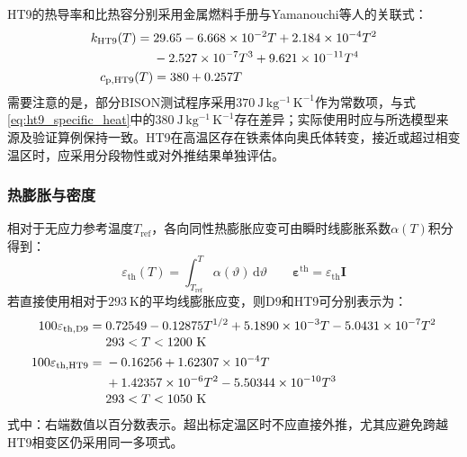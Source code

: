 HT9的热导率和比热容分别采用金属燃料手册与Yamanouchi等人的关联式\cite{hofmanMetallicFuelsHandbook2019,Yamanouchi_1992}：
\begin{subequations}\label{eq:ht9_thermal_properties}
	\begin{align}
		k_{\mathrm{HT9}}(T)
		={}&29.65-6.668\times10^{-2}T
		+2.184\times10^{-4}T^2
		\notag\\
		&-2.527\times10^{-7}T^3
		+9.621\times10^{-11}T^4
		\label{eq:ht9_thermal_conductivity}\\
		c_{\mathrm p,\mathrm{HT9}}(T)
		&=380+0.257T
		\label{eq:ht9_specific_heat}
	\end{align}
\end{subequations}
需要注意的是，部分BISON测试程序采用$370\ \mathrm{J\,kg^{-1}\,K^{-1}}$作为常数项，与式\eqref{eq:ht9_specific_heat}中的$380\ \mathrm{J\,kg^{-1}\,K^{-1}}$存在差异；实际使用时应与所选模型来源及验证算例保持一致。HT9在高温区存在铁素体向奥氏体转变，接近或超过相变温区时，应采用分段物性或对外推结果单独评估。

\subsubsection{热膨胀与密度}

相对于无应力参考温度$T_{\mathrm{ref}}$，各向同性热膨胀应变可由瞬时线膨胀系数$\alpha(T)$积分得到：
\begin{equation}
	\varepsilon_{\mathrm{th}}(T)
	=\int_{T_{\mathrm{ref}}}^{T}\alpha(\vartheta)\,\mathrm d\vartheta
	\qquad
	\boldsymbol{\varepsilon}^{\mathrm{th}}
	=\varepsilon_{\mathrm{th}}\boldsymbol I
	\label{eq:clad_thermal_strain_general}
\end{equation}
若直接使用相对于$293\ \mathrm{K}$的平均线膨胀应变，则D9和HT9可分别表示为\cite{Leibowitz_1988,hofmanMetallicFuelsHandbook2019}：
\begin{subequations}\label{eq:clad_d9_ht9_thermal_expansion}
	\begin{align}
		100\varepsilon_{\mathrm{th,D9}}
		={}&0.72549-0.12875T^{1/2}
		+5.1890\times10^{-3}T
		-5.0431\times10^{-7}T^2
		\nonumber\\[-0.2em]
		&293<T<1200\ \mathrm{K}
		\label{eq:d9_thermal_expansion}\\
		100\varepsilon_{\mathrm{th,HT9}}
		={}&-0.16256+1.62307\times10^{-4}T
		\notag\\
		&+1.42357\times10^{-6}T^2
		-5.50344\times10^{-10}T^3
		\nonumber\\[-0.2em]
		&293<T<1050\ \mathrm{K}
		\label{eq:ht9_thermal_expansion}
	\end{align}
\end{subequations}
\noindent 式中：右端数值以百分数表示。超出标定温区时不应直接外推，尤其应避免跨越HT9相变区仍采用同一多项式。

